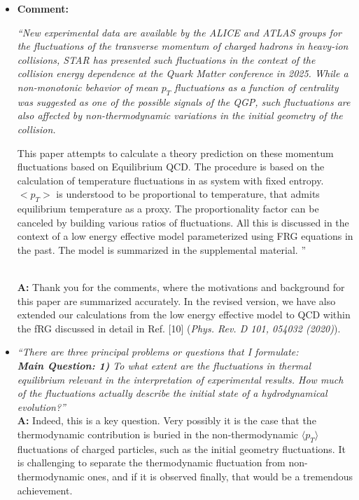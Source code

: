 \documentclass[aps,article,author-year,notitlepage,showpacs]{revtex4-2}
\begin{document}
\begin{itemize}

\item[$\bullet$] {\bf Comment:} {\it ``New experimental data are available by the ALICE and ATLAS groups for
the fluctuations of the transverse momentum of charged hadrons in
heavy-ion collisions, STAR has presented such fluctuations in the
context of the collision energy dependence at the Quark Matter
conference in 2025. While a non-monotonic behavior of mean $p_T$
fluctuations as a function of centrality was suggested as one of the
possible signals of the QGP, such fluctuations are also affected by
non-thermodynamic variations in the initial geometry of the collision.

This paper attempts to calculate a theory prediction on these momentum
fluctuations based on Equilibrium QCD. The procedure is based on the
calculation of temperature fluctuations in as system with fixed
entropy. $<p_T>$ is understood to be proportional to temperature, that
admits equilibrium temperature as a proxy. The proportionality factor
can be canceled by building various ratios of fluctuations. All this
is discussed in the context of a low energy effective model
parameterized using FRG equations in the past. The model is summarized
in the supplemental material.
''}\\[-1ex]

{\bf A:} Thank you for the comments, where the motivations and background for this paper are summarized accurately. In the revised version, we have also extended our calculations from the low energy effective model to QCD within the fRG discussed in detail in Ref. [10] ({\it Phys. Rev. D 101, 054032 (2020)}). \\[1ex]

\item[$\bullet$] {\it ``There are three principal problems or questions that I formulate:\\[-2ex]

{\bf Main Question: 1)} To what extent are the fluctuations in thermal equilibrium relevant
in the interpretation of experimental results. How much of the
fluctuations actually describe the initial state of a hydrodynamical
evolution?''}\\[-1ex]

{\bf A:} Indeed, this is a key question. Very possibly it is the case that the thermodynamic contribution is buried in the non-thermodynamic $\langle p_{T} \rangle$ fluctuations of charged particles, such as the initial geometry fluctuations. It is challenging to separate the thermodynamic fluctuation from non-thermodynamic ones, and if it is observed finally, that would be a tremendous achievement. \\[-2ex]


\end{itemize}
\end{document}
